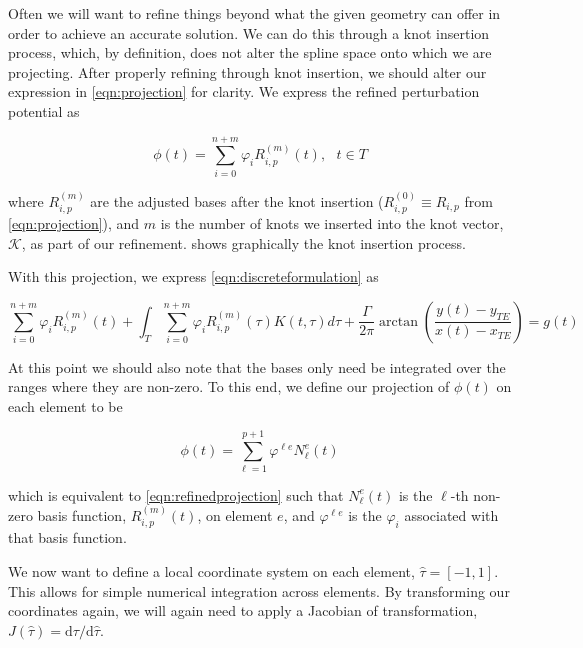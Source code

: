 	Often we will want to refine things beyond what the given geometry can offer in order to achieve an accurate solution. We can do this through a knot insertion process, which, by definition, does not alter the spline space onto which we are projecting. After properly refining through knot insertion, we should alter our expression in \cref{eqn:projection} for clarity. We express the refined perturbation potential as
	
	\begin{equation}
	\label{eqn:refinedprojection}
	\phi(t) = \sum_{i=0}^{n+m}\varphi_i R_{i,p}^{(m)}(t),~~~t \in T
	\end{equation}
	
	\noindent where $R_{i,p}^{(m)}$ are the adjusted bases after the knot insertion ($R_{i,p}^{(0)} \equiv R_{i,p}$ from \cref{eqn:projection}), and $m$ is the number of knots we inserted into the knot vector, $\mathcal{K}$, as part of our refinement.  shows graphically the knot insertion process.
	
	With this projection, we express \cref{eqn:discreteformulation} as
	
	\begin{equation}
	\label{eqn:discrete1}
	\sum_{i=0}^{n+m}\varphi_i R_{i,p}^{(m)}(t) + \int_{T} \sum_{i=0}^{n+m}\varphi_i R_{i,p}^{(m)}(\tau) K(t,\tau) d\tau + \frac{\Gamma}{2\pi} \arctan\left( \frac{y(t) - y_{TE}}{x(t)-x_{TE}} \right) = g(t)
	\end{equation}
	
	\noindent At this point we should also note that the bases only need be integrated over the ranges where they are non-zero. To this end, we define our projection of \(\phi(t)\) on each element to be
	
	\begin{equation}
	\label{eqn:elementprojection}
	\phi(t) = \sum_{\ell=1}^{p+1}\varphi^{\ell e} N_{\ell}^{e}(t)
	\end{equation}
	
	\noindent which is equivalent to \cref{eqn:refinedprojection} such that \(N_{\ell}^{e}(t)\) is the \(\ell\)-th non-zero basis function, \(R_{i,p}^{(m)}(t)\), on element $e$, and \(\varphi^{\ell e}\) is the \(\varphi_i\) associated with that basis function.
	
	We now want to define a local coordinate system on each element, \(\hat{\tau} = [-1,1]\). This allows for simple numerical integration across elements. By transforming our coordinates again, we will again need to apply a Jacobian of transformation, \(J(\hat{\tau}) = \text{d}\tau/\text{d}\hat{\tau} \).
	
